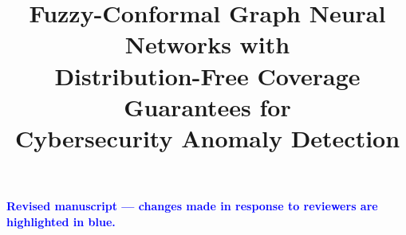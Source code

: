 \documentclass[sn-basic]{sn-jnl}
\theoremstyle{plain}
\theoremstyle{remark}
\begin{document}
\title[Fuzzy-Conformal Graph Neural Networks]{Fuzzy-Conformal Graph Neural Networks with\\
       Distribution-Free Coverage Guarantees for\\
       Cybersecurity Anomaly Detection}

\author*[1]{ }




\maketitle

\begin{center}
\textcolor{blue}{\textbf{Revised manuscript --- changes made in response to reviewers are highlighted in blue.}}
\end{center}









\end{document}
